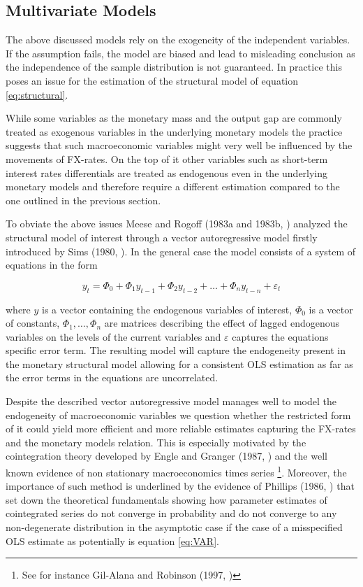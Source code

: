 \subsection{Multivariate Models}
\label{sub:multivariate}
The above discussed models rely on the exogeneity of the independent variables. If the assumption
fails, the model are biased and lead to misleading conclusion as the independence of the
sample distribution is not guaranteed. In practice this poses an issue for the estimation
of the structural model of equation \ref{eq:structural}.

While some variables as the monetary
mass and the output gap are commonly treated as exogenous variables in the underlying monetary models
the practice suggests that such macroeconomic variables might very well be influenced by the
movements of FX-rates. On the top of it other variables such as short-term interest rates differentials
are treated as endogenous even in the underlying monetary models and therefore require a different estimation
compared to the one outlined in the previous section.

To obviate the above issues Meese and Rogoff (1983a and 1983b, \cite{MeeseRogoffa, MeeseRogoffb}) analyzed the structural model
of interest through a vector autoregressive model firstly introduced by Sims (1980, \cite{Sims1980}).
In the general case the model consists of a system of equations in the form

\begin{equation} \label{eq:VAR}
y_{t} =  \Phi_{0}+ \Phi_{1}y_{t-1} + \Phi_{2}y_{t-2} + \dots + \Phi_{n}y_{t-n} + \varepsilon_{t}
\end{equation}

where $y$ is a vector containing the endogenous variables of interest, $\Phi_0$ is a vector of constants,
$\Phi_1,  \dots  , \Phi_n$ are matrices describing the effect of lagged endogenous variables on the levels of
the current variables and $\varepsilon$ captures the equations specific error term.
The resulting model will capture the endogeneity present in the monetary structural model allowing for a consistent
OLS estimation as far as the error terms in the equations are uncorrelated.

Despite the described vector autoregressive model manages well to model the endogeneity of macroeconomic
variables we question whether the restricted form of it could yield more efficient and more reliable estimates capturing
the FX-rates and the monetary models relation. This is especially motivated by the cointegration theory developed
by Engle and Granger (1987, \cite{EngleGranger}) and the well known evidence of non stationary macroeconomics
times series \footnote{See for instance Gil-Alana and Robinson (1997, \cite{GilAlanaRobinson})}. Moreover, the importance
of such method is underlined by the evidence of Phillips (1986, \cite{Phillips}) that set down the theoretical fundamentals
showing how parameter estimates of cointegrated series do not converge in probability and do not converge to any
non-degenerate distribution in the asymptotic case if the case of a misspecified OLS estimate as potentially is equation \ref{eq:VAR}.

